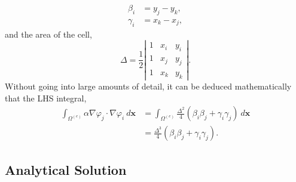 \begin{align}
	\beta_i &= y_j - y_k,\\
	\gamma_i &= x_k - x_j,
\end{align} 
and the area of the cell,
\begin{equation}
	\Delta = \frac{1}{2}\left\vert
	\begin{matrix}
		1 & x_i & y_i \\
		1 & x_j & y_j \\
		1 & x_k & y_k
	\end{matrix}\right\vert.
\end{equation}
Without going into large amounts of detail, it can be deduced mathematically that the LHS integral,
\begin{align}
	\int_{\Omega^{(e)}} \alpha \nabla \varphi_j \cdot \nabla \varphi_i~d\mathbf{x} &= \int_{\Omega^{(e)}}\frac{\Delta^2}{4}(\beta_i\beta_j + \gamma_i\gamma_j)~d\mathbf{x}\\
	&= \frac{\Delta^3}{4}(\beta_i\beta_j + \gamma_i\gamma_j).
\end{align}
\subsection{Analytical Solution}

